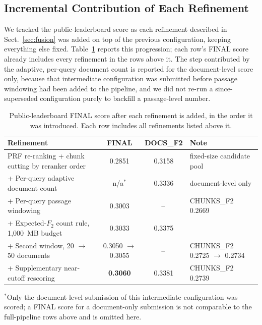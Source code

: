 \documentclass[runningheads]{llncs}
\begin{document}
\subsection{Incremental Contribution of Each Refinement}
\label{sec:ablation}

We tracked the public-leaderboard score as each refinement described in
Sect.~\ref{sec:fusion} was added on top of the previous configuration, keeping
everything else fixed. Table~\ref{tab:progression} reports this progression;
each row's FINAL score already includes every refinement in the rows above
it. The step contributed by the adaptive, per-query document count is
reported for the document-level score only, because that intermediate
configuration was submitted before passage windowing had been added to the
pipeline, and we did not re-run a since-superseded configuration purely to
backfill a passage-level number.

\begin{table}[H]
\centering
\caption{Public-leaderboard FINAL score after each refinement is added, in
the order it was introduced. Each row includes all refinements listed above
it.}
\label{tab:progression}
\small
\setlength{\tabcolsep}{4pt}
\begin{tabular}{lccl}
\hline
Refinement & FINAL & DOCS\_F2 & Note \\
\hline
PRF re-ranking + chunk cutting by reranker order & 0.2851 & 0.3158 & fixed-size candidate pool \\
+ Per-query adaptive document count & n/a$^{*}$ & 0.3336 & document-level only \\
+ Per-query passage windowing & 0.3003 & --\, & CHUNKS\_F2 0.2669 \\
+ Expected-$F_2$ count rule, 1{,}000~MB budget & 0.3033 & 0.3375 & \\
+ Second window, 20 $\rightarrow$ 50 documents & 0.3050 $\rightarrow$ 0.3055 & --\, & CHUNKS\_F2 0.2725 $\rightarrow$ 0.2734 \\
+ Supplementary near-cutoff rescoring & \textbf{0.3060} & 0.3381 & CHUNKS\_F2 0.2739 \\
\hline
\end{tabular}

\smallskip
\footnotesize $^{*}$Only the document-level submission of this intermediate
configuration was scored; a FINAL score for a document-only submission is
not comparable to the full-pipeline rows above and is omitted here.
\end{table}
\end{document}

